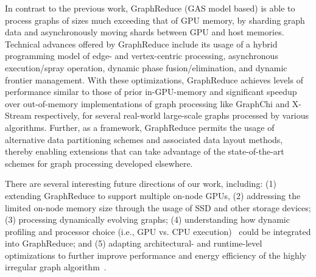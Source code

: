 In contrast to the previous work, GraphReduce (GAS model based) is able to process graphs of sizes much exceeding that of GPU memory, by sharding graph data and asynchronously moving shards between GPU and host memories. Technical advances offered by GraphReduce include its usage of a hybrid programming model of edge- and vertex-centric processing, asynchronous execution/spray operation, dynamic phase fusion/elimination, and dynamic frontier management. With these optimizations, GraphReduce achieves levels of performance similar to those of prior in-GPU-memory and significant speedup over out-of-memory implementations of graph processing like GraphChi and X-Stream respectively, for several real-world large-scale graphs processed by various algorithms. Further, as a framework, GraphReduce permits the usage of alternative data partitioning schemes and associated data layout methods, thereby enabling extensions that can take advantage of the state-of-the-art schemes for graph processing developed elsewhere.

There are several interesting future directions of our work, including: (1) extending GraphReduce to support multiple on-node GPUs, (2) addressing the limited on-node memory size through the usage of SSD and other storage devices; (3) processing dynamically evolving graphs; (4) understanding how dynamic profiling and processor choice (i.e., GPU vs. CPU execution)~\cite{naila} could be integrated into GraphReduce; and (5) adapting architectural- and runtime-level optimizations to further improve performance and energy efficiency of the highly irregular graph algorithm~\cite{GR25, GR37, GR38}.

